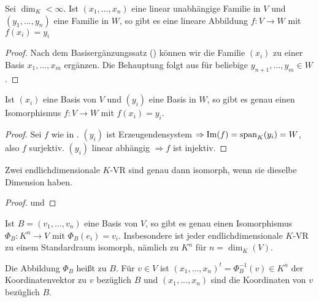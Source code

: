 \begin{conclusion}
	Sei $\dim_K<\infty$. Ist $(x_1,...,x_n)$ eine linear unabhängige Familie in $V$ und $(y_1,...,y_n)$ 
	eine Familie in $W$, so gibt es eine lineare Abbildung $f:V\to W$ mit $f(x_i)=y_i$
\end{conclusion}
\begin{proof}
	Nach dem Basisergänzungssatz () können wir die Familie $(x_i)$ zu einer Basis $x_1,...,x_m$ ergänzen. Die Behauptung 
	folgt aus  für beliebige $y_{n+1},...,y_m\in W$.
\end{proof}

\begin{conclusion}
	Ist $(x_i)$ eine Basis von $V$ und $(y_i)$ eine Basis in $W$, so gibt es genau einen Isomorphismus 
	$f:V\to W$ mit $f(x_i)=y_i$.
\end{conclusion}
\begin{proof}
	Sei $f$ wie in . $(y_i)$ ist Erzeugendensystem $\Rightarrow \operatorname{Im}(f)=\operatorname{span}_K(y_i)=W$, also $f$ surjektiv. 
	$(y_i)$ linear abhängig $\Rightarrow f$ ist injektiv.
\end{proof}

\begin{conclusion}
	Zwei endlichdimensionale $K$-VR sind genau dann isomorph, wenn sie dieselbe Dimension haben.
\end{conclusion}
\begin{proof}
	 und 
\end{proof}

\begin{conclusion}
	Ist $B=(v_1,...,v_n)$ eine Basis von $V$, so gibt es genau einen Isomorphismus $\Phi_B:K^n\to 
	V$ mit $\Phi_B(e_i)=v_i$. Insbesondere ist jeder endlichdimensionale $K$-VR zu einem Standardraum isomorph, nämlich zu
	$K^n$ für $n=\dim_K(V)$.
\end{conclusion}

\begin{definition}[Koordinatensystem]
	Die Abbildung $\Phi_B$ heißt  zu $B$. Für $v\in V$ ist 
	$(x_1,...,x_n)^t=\Phi^{-1}_B(v)\in K^n$ der Koordinatenvektor zu $v$ bezüglich $B$ und $(x_1,...,x_n)$ sind die 
	Koordinaten von $v$ bezüglich $B$.
\end{definition}

